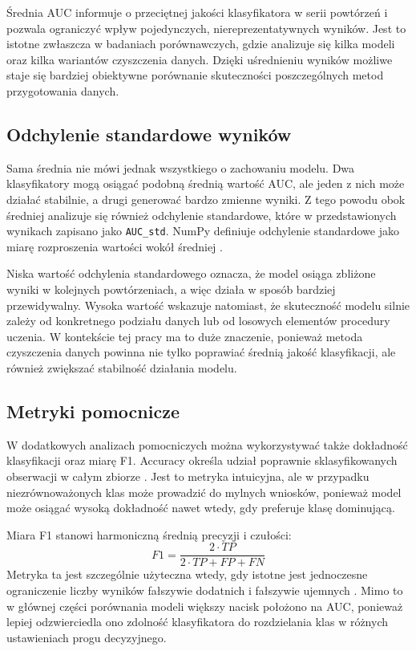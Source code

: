 {Średnia AUC informuje o przeciętnej jakości klasyfikatora w serii powtórzeń i pozwala ograniczyć wpływ pojedynczych, niereprezentatywnych wyników. Jest to istotne zwłaszcza w badaniach porównawczych, gdzie analizuje się kilka modeli oraz kilka wariantów czyszczenia danych. Dzięki uśrednieniu wyników możliwe staje się bardziej obiektywne porównanie skuteczności poszczególnych metod przygotowania danych.

\subsection{Odchylenie standardowe wyników}
Sama średnia nie mówi jednak wszystkiego o zachowaniu modelu. Dwa klasyfikatory mogą osiągać podobną średnią wartość AUC, ale jeden z nich może działać stabilnie, a drugi generować bardzo zmienne wyniki. Z tego powodu obok średniej analizuje się również odchylenie standardowe, które w przedstawionych wynikach zapisano jako \texttt{AUC\_std}. NumPy definiuje odchylenie standardowe jako miarę rozproszenia wartości wokół średniej \cite{NumpyStd}.

Niska wartość odchylenia standardowego oznacza, że model osiąga zbliżone wyniki w kolejnych powtórzeniach, a więc działa w sposób bardziej przewidywalny. Wysoka wartość wskazuje natomiast, że skuteczność modelu silnie zależy od konkretnego podziału danych lub od losowych elementów procedury uczenia. W kontekście tej pracy ma to duże znaczenie, ponieważ metoda czyszczenia danych powinna nie tylko poprawiać średnią jakość klasyfikacji, ale również zwiększać stabilność działania modelu.

\subsection{Metryki pomocnicze}
W dodatkowych analizach pomocniczych można wykorzystywać także dokładność klasyfikacji oraz miarę F1. Accuracy określa udział poprawnie sklasyfikowanych obserwacji w całym zbiorze \cite{SklearnAccuracy}. Jest to metryka intuicyjna, ale w przypadku niezrównoważonych klas może prowadzić do mylnych wniosków, ponieważ model może osiągać wysoką dokładność nawet wtedy, gdy preferuje klasę dominującą.

Miara F1 stanowi harmoniczną średnią precyzji i czułości:
\[
F1 = \frac{2 \cdot TP}{2 \cdot TP + FP + FN}
\]
Metryka ta jest szczególnie użyteczna wtedy, gdy istotne jest jednoczesne ograniczenie liczby wyników fałszywie dodatnich i fałszywie ujemnych \cite{SklearnF1}. Mimo to w głównej części porównania modeli większy nacisk położono na AUC, ponieważ lepiej odzwierciedla ono zdolność klasyfikatora do rozdzielania klas w różnych ustawieniach progu decyzyjnego.
}
